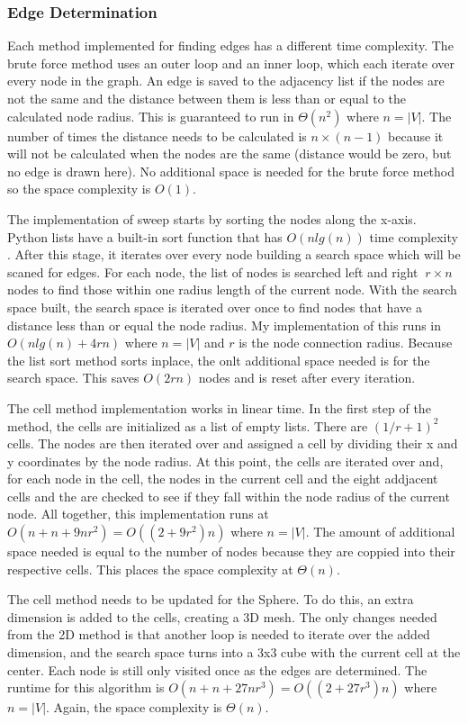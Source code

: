 \documentclass{article}
\begin{document}
        \subsubsection{Edge Determination}
        Each method implemented for finding edges has a different time complexity. The brute force method uses an outer loop and an inner loop, which each iterate over every node in the graph. An edge is saved to the adjacency list if the nodes are not the same and the distance between them is less than or equal to the calculated node radius. This is guaranteed to run in $\Theta\left(n^2\right)$ where $n = |V|$. The number of times the distance needs to be calculated is $n \times (n-1)$ because it will not be calculated when the nodes are the same (distance would be zero, but no edge is drawn here). No additional space is needed for the brute force method so the space complexity is $O(1)$.
        \par
        The implementation of sweep starts by sorting the nodes along the x-axis. Python lists have a built-in sort function that has $O\left(n lg(n)\right)$ time complexity \cite{listsort}. After this stage, it iterates over every node building a search space which will be scaned for edges. For each node, the list of nodes is searched left and right $~r\times n$ nodes to find those within one radius length of the current node. With the search space built, the search space is iterated over once to find nodes that have a distance less than or equal the node radius. My implementation of this runs in $O\left(n lg(n) + 4rn\right)$ where $n = |V|$ and $r$ is the node connection radius. Because the list sort method sorts inplace, the onlt additional space needed is for the search space. This saves $O(2rn)$ nodes and is reset after every iteration.
        \par
        The cell method implementation works in linear time. In the first step of the method, the cells are initialized as a list of empty lists. There are $(1/r + 1)^2$ cells. The nodes are then iterated over and assigned a cell by dividing their x and y coordinates by the node radius. At this point, the cells are iterated over and, for each node in the cell, the nodes in the current cell and the eight addjacent cells and the are checked to see if they fall within the node radius of the current node. All together, this implementation runs at $O\left(n + n + 9nr^2\right) = O\left((2 + 9r^2)n\right)$ where $n = |V|$. The amount of additional space needed is equal to the number of nodes because they are coppied into their respective cells. This places the space complexity at $\Theta(n)$.
        \par
        The cell method needs to be updated for the Sphere. To do this, an extra dimension is added to the cells, creating a 3D mesh. The only changes needed from the 2D method is that another loop is needed to iterate over the added dimension, and the search space turns into a 3x3 cube with the current cell at the center. Each node is still only visited once as the edges are determined. The runtime for this algorithm is $O\left(n + n + 27nr^3\right) = O\left((2 + 27r^3)n\right)$ where $n = |V|$. Again, the space complexity is $\Theta(n)$.
\end{document}

